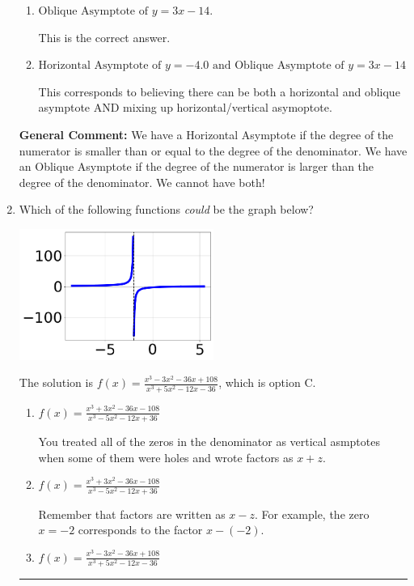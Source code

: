 \documentclass{extbook}[14pt]
\newcommand{\litem}[1]{\item #1

\rule{\textwidth}{0.4pt}}
\begin{document}
\begin{enumerate}
{\begin{enumerate}[label=\Alph*.]
This corresponds to using rule for Horizontal Asymptote when degree of numerator and denominator match.
\item \( \text{Oblique Asymptote of } y = 3x -14. \)

This is the correct answer.
\item \( \text{Horizontal Asymptote of } y = -4.0 \text{ and Oblique Asymptote of } y = 3x -14 \)

This corresponds to believing there can be both a horizontal and oblique asymptote AND mixing up horizontal/vertical asymoptote.
\end{enumerate}

\textbf{General Comment:} We have a Horizontal Asymptote if the degree of the numerator is smaller than or equal to the degree of the denominator. We have an Oblique Asymptote if the degree of the numerator is larger than the degree of the denominator. We cannot have both!
}
\litem{
Which of the following functions \textit{could} be the graph below?

\begin{center}
    \includegraphics[width=0.5\textwidth]{../Figures/identifyGraphOfRationalFunctionA.png}
\end{center}




The solution is \( f(x)=\frac{x^{3} -3 x^{2} -36 x + 108}{x^{3} +5 x^{2} -12 x -36} \), which is option C.\begin{enumerate}[label=\Alph*.]
\item \( f(x)=\frac{x^{3} +3 x^{2} -36 x -108}{x^{3} -5 x^{2} -12 x + 36} \)

You treated all of the zeros in the denominator as vertical asmptotes when some of them were holes and wrote factors as $x+z$.
\item \( f(x)=\frac{x^{3} +3 x^{2} -36 x -108}{x^{3} -5 x^{2} -12 x + 36} \)

Remember that factors are written as $x-z$. For example, the zero $x=-2$ corresponds to the factor $x-(-2)$.
\item \( f(x)=\frac{x^{3} -3 x^{2} -36 x + 108}{x^{3} +5 x^{2} -12 x -36} \)


\end{enumerate}}
\end{enumerate}
\end{document}
